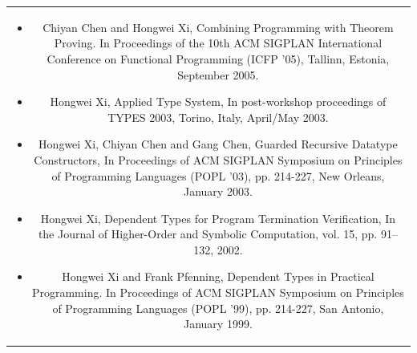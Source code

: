 \documentclass{article}
\begin{document}
\begin{tabular}{rp{\rightdim}}
\multicolumn{2}{c}{%
\begin{minipage}{\wholedim}
\begin{itemize}
\item Chiyan Chen and Hongwei Xi,
Combining Programming with Theorem Proving. In Proceedings of the 10th ACM
SIGPLAN International Conference on Functional Programming (ICFP '05),
Tallinn, Estonia, September 2005.
\item Hongwei Xi,
Applied Type System, In post-workshop proceedings of TYPES 2003, 
Torino, Italy, April/May 2003.
\item Hongwei Xi, Chiyan Chen and Gang Chen,
Guarded Recursive Datatype Constructors, In Proceedings of ACM SIGPLAN
Symposium on Principles of Programming Languages (POPL '03), pp. 214-227,
New Orleans, January 2003.
\item Hongwei Xi, Dependent Types for Program Termination Verification,
In the Journal of Higher-Order and Symbolic Computation, vol. 15,
pp. 91--132, 2002.
\item Hongwei Xi and Frank Pfenning, Dependent Types in Practical
Programming. In Proceedings of ACM SIGPLAN Symposium on Principles of
Programming Languages (POPL '99), pp. 214-227, San Antonio, January 1999.

\end{itemize}\end{minipage}
} \\[\middim]
\end{tabular}
\end{document}

